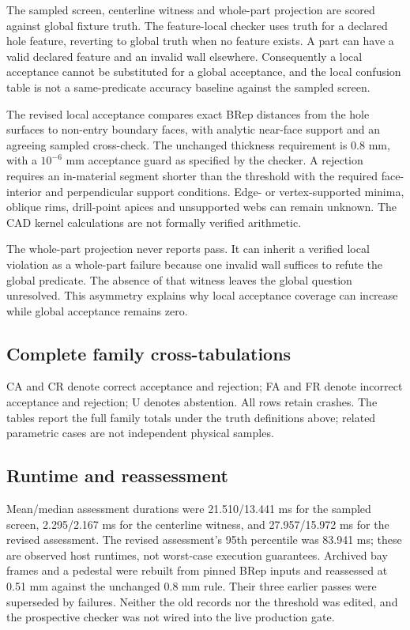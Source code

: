 The sampled screen, centerline witness and whole-part projection are scored against global fixture truth. The feature-local checker uses truth for a declared hole feature, reverting to global truth when no feature exists. A part can have a valid declared feature and an invalid wall elsewhere. Consequently a local acceptance cannot be substituted for a global acceptance, and the local confusion table is not a same-predicate accuracy baseline against the sampled screen.

The revised local acceptance compares exact BRep distances from the hole surfaces to non-entry boundary faces, with analytic near-face support and an agreeing sampled cross-check. The unchanged thickness requirement is 0.8 mm, with a $10^{-6}$ mm acceptance guard as specified by the checker. A rejection requires an in-material segment shorter than the threshold with the required face-interior and perpendicular support conditions. Edge- or vertex-supported minima, oblique rims, drill-point apices and unsupported webs can remain unknown. The CAD kernel calculations are not formally verified arithmetic.

The whole-part projection never reports pass. It can inherit a verified local violation as a whole-part failure because one invalid wall suffices to refute the global predicate. The absence of that witness leaves the global question unresolved. This asymmetry explains why local acceptance coverage can increase while global acceptance remains zero.



\subsection{Complete family cross-tabulations}
CA and CR denote correct acceptance and rejection; FA and FR denote incorrect acceptance and rejection; U denotes abstention. All rows retain crashes. The tables report the full family totals under the truth definitions above; related parametric cases are not independent physical samples.
\begin{center}\scriptsize

\end{center}

\subsection{Runtime and reassessment}
Mean/median assessment durations were 21.510/13.441 ms for the sampled screen, 2.295/2.167 ms for the centerline witness, and 27.957/15.972 ms for the revised assessment. The revised assessment's 95th percentile was 83.941 ms; these are observed host runtimes, not worst-case execution guarantees. Archived bay frames and a pedestal were rebuilt from pinned BRep inputs and reassessed at 0.51 mm against the unchanged 0.8 mm rule. Their three earlier passes were superseded by failures. Neither the old records nor the threshold was edited, and the prospective checker was not wired into the live production gate.

